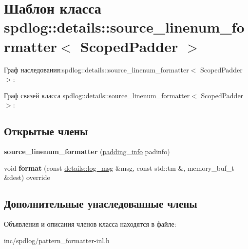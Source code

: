 \hypertarget{classspdlog_1_1details_1_1source__linenum__formatter}{}\section{Шаблон класса spdlog\+:\+:details\+:\+:source\+\_\+linenum\+\_\+formatter$<$ Scoped\+Padder $>$}
\label{classspdlog_1_1details_1_1source__linenum__formatter}


Граф наследования\+:spdlog\+:\+:details\+:\+:source\+\_\+linenum\+\_\+formatter$<$ Scoped\+Padder $>$\+:


Граф связей класса spdlog\+:\+:details\+:\+:source\+\_\+linenum\+\_\+formatter$<$ Scoped\+Padder $>$\+:
\subsection*{Открытые члены}
\begin{DoxyCompactItemize}
\item 
\mbox{\label{classspdlog_1_1details_1_1source__linenum__formatter_a906aff3ca741315e5752ff462e5dfdd6}} 
{\bfseries source\+\_\+linenum\+\_\+formatter} (\hyperlink{structspdlog_1_1details_1_1padding__info}{padding\+\_\+info} padinfo)
\item 
\mbox{\label{classspdlog_1_1details_1_1source__linenum__formatter_a6ed7c7c64e66ae7a8b417f3d4982e6a2}} 
void {\bfseries format} (const \hyperlink{structspdlog_1_1details_1_1log__msg}{details\+::log\+\_\+msg} \&msg, const std\+::tm \&, memory\+\_\+buf\+\_\+t \&dest) override
\end{DoxyCompactItemize}
\subsection*{Дополнительные унаследованные члены}


Объявления и описания членов класса находятся в файле\+:\begin{DoxyCompactItemize}
\item 
inc/spdlog/pattern\+\_\+formatter-\/inl.\+h\end{DoxyCompactItemize}
